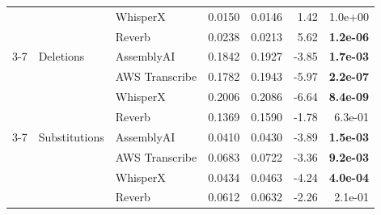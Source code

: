 \begin{tabular}{lllrrrr}
  &   & WhisperX & 0.0150 & 0.0146 & 1.42 &  1.0e+00 \\
  &   & Reverb & 0.0238 & 0.0213 & 5.62 & \textbf{ 1.2e-06} \\
\cmidrule(r){3-7}
  & Deletions & AssemblyAI & 0.1842 & 0.1927 & -3.85 & \textbf{ 1.7e-03} \\
  &   & AWS Transcribe & 0.1782 & 0.1943 & -5.97 & \textbf{ 2.2e-07} \\
  &   & WhisperX & 0.2006 & 0.2086 & -6.64 & \textbf{ 8.4e-09} \\
  &   & Reverb & 0.1369 & 0.1590 & -1.78 &  6.3e-01 \\
\cmidrule(r){3-7}
  & Substitutions & AssemblyAI & 0.0410 & 0.0430 & -3.89 & \textbf{ 1.5e-03} \\
  &   & AWS Transcribe & 0.0683 & 0.0722 & -3.36 & \textbf{ 9.2e-03} \\
  &   & WhisperX & 0.0434 & 0.0463 & -4.24 & \textbf{ 4.0e-04} \\
  &   & Reverb & 0.0612 & 0.0632 & -2.26 &  2.1e-01 \\
\bottomrule
\end{tabular}
